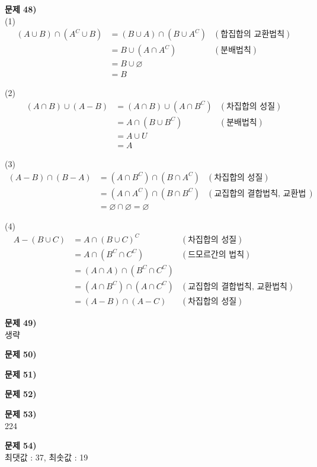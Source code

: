 \documentclass{oblivoir}
\newcommand\an[1]{\par\bigskip\noindent\textbf{문제 #1)}\\}
\begin{document}
%
\an{48}
(1)
\begin{align*}
(A\cup B)\cap(A^C\cup B)
&=(B\cup A)\cap(B\cup A^C)	&(\text{합집합의 교환법칙})\\
&=B\cup(A\cap A^C)		&(\text{분배법칙})\\
&=B\cup\varnothing\\
&=B
\end{align*}
\par\noindent
(2)
\begin{align*}
(A\cap B)\cup(A-B)
&=(A\cap B)\cup(A\cap B^C)	&(\text{차집합의 성질})\\
&=A\cap(B\cup B^C)		&(\text{분배법칙})\\
&=A\cup U\\
&=A
\end{align*}
\par\noindent
(3)
\begin{align*}
(A-B)\cap(B-A)
&=(A\cap B^C)\cap(B\cap A^C)	&(\text{차집합의 성질})\\
&=(A\cap A^C)\cap(B\cap B^C)	&(\text{교집합의 결합법칙, 교환법칙})\\
&=\varnothing\cap\varnothing=\varnothing
\end{align*}
\par\noindent
(4)
\begin{align*}
A-(B\cup C)
&=A\cap(B\cup C)^C			&(\text{차집합의 성질})\\
&=A\cap(B^C\cap C^C)			&(\text{드모르간의 법칙})\\
&=(A\cap A)\cap(B^C\cap C^C)		\\
&=(A\cap B^C)\cap(A\cap C^C)	&(\text{교집합의 결합법칙, 교환법칙})\\
&=(A-B)\cap(A-C)				&(\text{차집합의 성질})
\end{align*}

%
\an{49}
생략

%
\an{50}

%
\an{51}

%
\an{52}

%
\an{53}
224

%
\an{54}
최댓값 : 37, 최솟값 : 19
\end{document}
